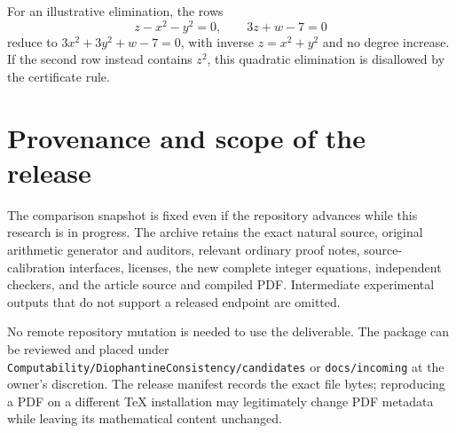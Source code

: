 \documentclass[11pt,letterpaper]{article}
\theoremstyle{definition}
\begin{document}
For an illustrative elimination, the rows
\[
z-x^2-y^2=0,\qquad 3z+w-7=0
\]
reduce to $3x^2+3y^2+w-7=0$, with inverse $z=x^2+y^2$ and no degree
increase. If the second row instead contains $z^2$, this quadratic
elimination is disallowed by the certificate rule.

\section{Provenance and scope of the release}

The comparison snapshot is fixed even if the repository advances while
this research is in progress. The archive retains the exact natural
source, original arithmetic generator and auditors, relevant ordinary
proof notes, source-calibration interfaces, licenses, the new complete
integer equations, independent checkers, and the article source and
compiled PDF. Intermediate experimental outputs that do not support a
released endpoint are omitted.

No remote repository mutation is needed to use the deliverable. The
package can be reviewed and placed under
\texttt{Computability/DiophantineConsistency/candidates} or
\texttt{docs/incoming} at the owner's discretion. The release manifest
records the exact file bytes; reproducing a PDF on a different TeX
installation may legitimately change PDF metadata while leaving its
mathematical content unchanged.
\end{document}
